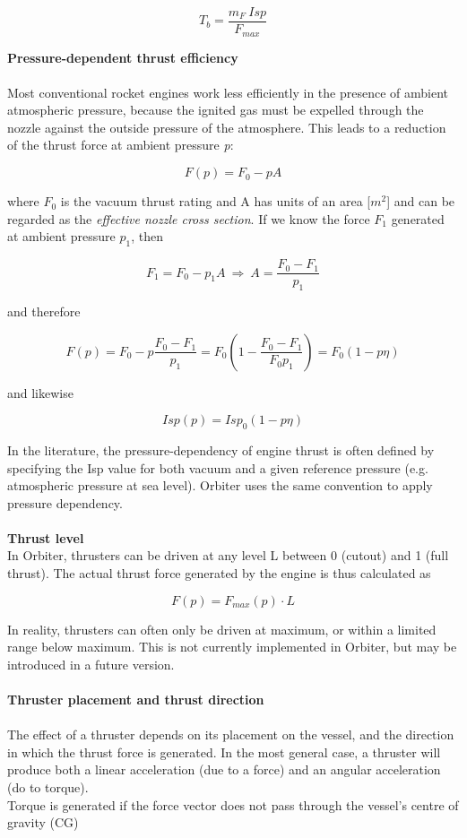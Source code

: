 \documentclass[Orbiter Developer Manual.tex]{subfiles}
\begin{document}
\[ T_{b} = \frac{m_{F} \ Isp}{F_{max}} \]

\noindent
\textbf{Pressure-dependent thrust efficiency}\\
\\
Most conventional rocket engines work less efficiently in the presence of ambient atmospheric pressure, because the ignited gas must be expelled through the nozzle against the outside pressure of the atmosphere. This leads to a reduction of the thrust force at ambient pressure \textit{p}:

\[ F(p) = F_{0} - p A \]

\noindent
where $F_{0}$ is the vacuum thrust rating and A has units of an area [$m^{2}$] and can be regarded as the \textit{effective nozzle cross section}. If we know the force $F_{1}$ generated at ambient pressure $p_{1}$, then

\[ F_{1} = F_{0} - p_{1}A \ \Rightarrow \ A = \frac{F_{0} - F_{1}}{p_{1}} \]

\noindent
and therefore

\[ F(p) = F_{0} - p\frac{F_{0} - F_{1}}{p_{1}} = F_{0}(1 - \frac{F_{0} - F_{1}}{F_{0}p_{1}}) = F_{0}(1 - p\eta) \]

\noindent
and likewise

\[ Isp(p) = Isp_{0}(1 - p\eta) \]

\noindent
In the literature, the pressure-dependency of engine thrust is often defined by specifying the Isp value for both vacuum and a given reference pressure (e.g. atmospheric pressure at sea level). Orbiter uses the same convention to apply pressure dependency.\\
\\
\textbf{Thrust level}\\
In Orbiter, thrusters can be driven at any level L between 0 (cutout) and 1 (full thrust). The actual thrust force generated by the engine is thus calculated as

\[ F(p) = F_{max}(p) \cdot L \]

\noindent
In reality, thrusters can often only be driven at maximum, or within a limited range below maximum. This is not currently implemented in Orbiter, but may be introduced in a future version.\\
\\
\textbf{Thruster placement and thrust direction}\\
\\
The effect of a thruster depends on its placement on the vessel, and the direction in which the thrust force is generated. In the most general case, a thruster will produce both a linear acceleration (due to a force) and an angular acceleration (do to torque).\\
Torque is generated if the force vector does not pass through the vessel's centre of gravity (CG)
\end{document}
